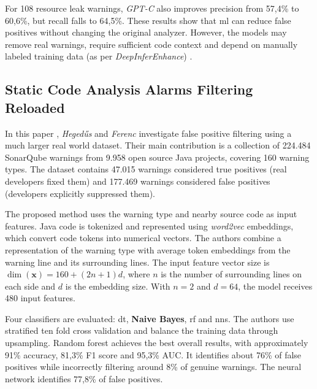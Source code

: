 \hspace{0.6em} For 108 resource leak warnings, \textit{GPT-C} also improves precision from 57,4\% to 60,6\%, but recall falls to 64,5\%. These results show that \gls{ml} can reduce false positives without changing the original analyzer. However, the models may remove real warnings, require sufficient code context and depend on manually labeled training data (as per \textit{DeepInferEnhance}) \cite{paper1_kharkarlearning2022}.



\subsection{Static Code Analysis Alarms Filtering Reloaded}

\hspace{0.6em} In this paper \cite{paper2_hegedHus2022static}, \textit{Hegedűs} and \textit{Ferenc} investigate false positive filtering using a much larger real world dataset. Their main contribution is a collection of 224.484 SonarQube \cite{sonarqube_docs} warnings from 9.958 open source Java projects, covering 160 warning types. The dataset contains 47.015 warnings considered true positives (real developers fixed them) and 177.469 warnings considered false positives (developers explicitly suppressed them).

\hspace{0.6em} The proposed method uses the warning type and nearby source code as input features. Java code is tokenized and represented using \textit{word2vec} \cite{word2vec} embeddings, which convert code tokens into numerical vectors. The authors combine a representation of the warning type with average token embeddings from the warning line and its surrounding lines. The input feature vector size is $\dim(\mathbf{x})=160+(2n+1)d$, where \(n\) is the number of surrounding lines on each side and \(d\) is the embedding size. With \(n=2\) and \(d=64\), the model receives 480 input features.

\hspace{0.6em} Four classifiers are evaluated: \gls{dt}, \textbf{Naive Bayes}, \gls{rf} and \gls{nns}. The authors use stratified ten fold cross validation and balance the training data through upsampling. Random forest achieves the best overall results, with approximately 91\% accuracy, 81,3\% F1 score and 95,3\% AUC. It identifies about 76\% of false positives while incorrectly filtering around 8\% of genuine warnings. The neural network identifies 77,8\% of false positives.

